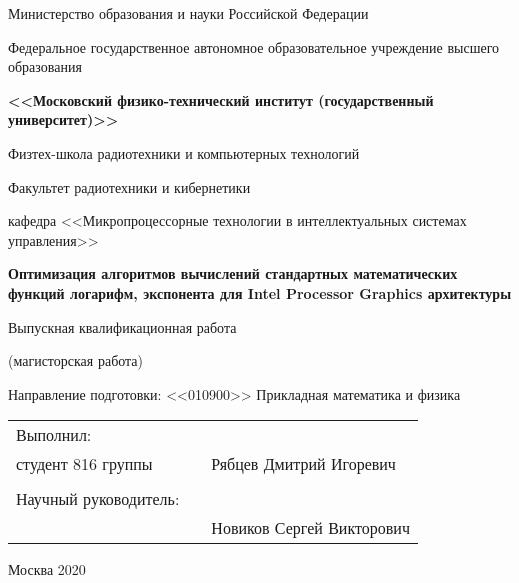 \begin{titlepage}
	\begin{center}
    	Министерство образования и науки Российской Федерации
		
		\vspace{1cm}
		
		Федеральное государственное автономное образовательное учреждение высшего образования
		 
		\textbf{<<Московский физико-технический институт (государственный университет)>>}
		
		\vspace{1cm}
		
		Физтех-школа радиотехники и компьютерных технологий

		Факультет радиотехники и кибернетики
		
		\vspace{1cm}
		
		кафедра <<Микропроцессорные технологии в интеллектуальных 
		системах управления>>
		
		\vfill
		\textbf{\Large Оптимизация алгоритмов вычислений стандартных
		математических функций логарифм, экспонента для Intel Processor Graphics архитектуры}
		
		\vspace{1cm}
		
		Выпускная квалификационная работа
		
		(магисторская работа)
		
		\vspace{1cm}		
		
		Направление подготовки: <<010900>> Прикладная математика и
		физика

	\end{center}
	\vfill

	\begin{tabular}{lrl}
		Выполнил: & & \\
		студент 816 группы & \hfill \underline{\hspace{5cm}} & Рябцев Дмитрий Игоревич \\
		& & \\
		Научный руководитель: & & \\
		& \hfill \underline{\hspace{5cm}} & Новиков Сергей Викторович
	\end{tabular}
	\vfill
 
	\begin{center}
  		Москва 2020
	\end{center}
\end{titlepage}